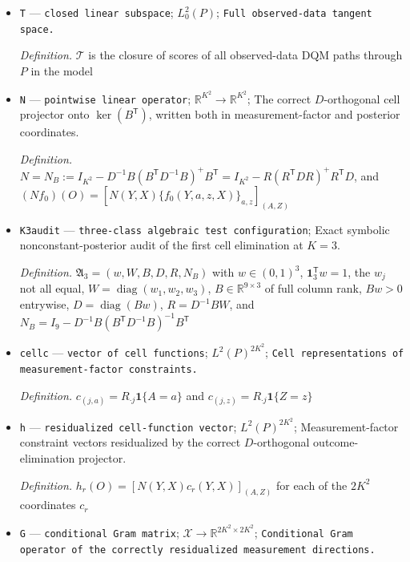 \documentclass{article}
\begin{document}
\begin{itemize}
  \par\smallskip\noindent\emph{Definition.} \(\mathcal S_{\mathrm{lat}}=\{E[s_X(X)+s_\pi(J,X)+s_Y(Y,J,X)+s_A(A,J,X)+s_Z(Z,J,X)\mid O]\}\), with every factor score centered under its own conditional factor law
  \item \texttt{T} --- \texttt{closed linear subspace}; \(L^{2}_{0}(P)\); \texttt{Full observed-\allowbreak{}data tangent space.}
  \par\smallskip\noindent\emph{Definition.} \(\mathcal T\) is the closure of scores of all observed-data DQM paths through \(P\) in the model
  \item \texttt{N} --- \texttt{pointwise linear operator}; \(\mathbb R^{K^{2}}\to\mathbb R^{K^{2}}\); The correct \(D\)-orthogonal cell projector onto \(\ker(B^{\mathsf T})\), written both in measurement-factor and posterior coordinates.
  \par\smallskip\noindent\emph{Definition.} \(N=N_B:=I_{K^{2}}-D^{-1}B(B^{\mathsf T}D^{-1}B)^{+}B^{\mathsf T}=I_{K^{2}}-R(R^{\mathsf T}DR)^{+}R^{\mathsf T}D\), and \((Nf_0)(O)=[N(Y,X)\{f_0(Y,a,z,X)\}_{a,z}]_{(A,Z)}\)
  \item \texttt{K3audit} --- \texttt{three-\allowbreak{}class algebraic test configuration}; Exact symbolic nonconstant-posterior audit of the first cell elimination at \(K=3\).
  \par\smallskip\noindent\emph{Definition.} \(\mathfrak A_3=(w,W,B,D,R,N_B)\) with \(w\in(0,1)^3\), \(\mathbf 1_3^{\mathsf T}w=1\), the \(w_j\) not all equal, \(W=\operatorname{diag}(w_1,w_2,w_3)\), \(B\in\mathbb R^{9\times3}\) of full column rank, \(Bw>0\) entrywise, \(D=\operatorname{diag}(Bw)\), \(R=D^{-1}BW\), and \(N_B=I_9-D^{-1}B(B^{\mathsf T}D^{-1}B)^{-1}B^{\mathsf T}\)
  \item \texttt{cellc} --- \texttt{vector of cell functions}; \(L^{2}(P)^{2K^{2}}\); \texttt{Cell representations of measurement-\allowbreak{}factor constraints.}
  \par\smallskip\noindent\emph{Definition.} \(c_{(j,a)}=R_{\cdot j}\mathbf 1\{A=a\}\) and \(c_{(j,z)}=R_{\cdot j}\mathbf 1\{Z=z\}\)
  \item \texttt{h} --- \texttt{residualized cell-\allowbreak{}function vector}; \(L^{2}(P)^{2K^{2}}\); Measurement-factor constraint vectors residualized by the correct \(D\)-orthogonal outcome-elimination projector.
  \par\smallskip\noindent\emph{Definition.} \(h_r(O)=[N(Y,X)c_r(Y,X)]_{(A,Z)}\) for each of the \(2K^{2}\) coordinates \(c_r\)
  \item \texttt{G} --- \texttt{conditional Gram matrix}; \(\mathcal X\to\mathbb R^{2K^{2}\times2K^{2}}\); \texttt{Conditional Gram operator of the correctly residualized measurement directions.}

\end{itemize}
\end{document}
